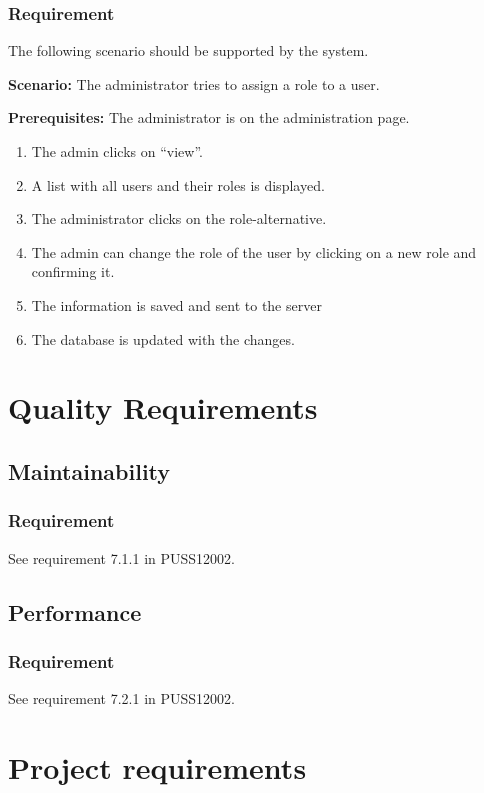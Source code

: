 \documentclass{article}
\begin{document}
\subsubsection{Requirement}
The following scenario should be supported by the system.

\textbf{Scenario:} The administrator tries to assign a role to a user.

\textbf{Prerequisites:} The administrator is on the administration page.

\begin{enumerate}
    \item The admin clicks on “view”.
    \item A list with all users and their roles is displayed.
    \item The administrator clicks on the role-alternative.
    \item The admin can change the role of the user by clicking on a new role and confirming it.
    \item The information is saved and sent to the server
    \item The database is updated with the changes.
\end{enumerate}



\section{Quality Requirements}
\subsection{Maintainability}
\subsubsection{Requirement}
See requirement 7.1.1 in PUSS12002.
\subsection{Performance}
\subsubsection{Requirement}
See requirement 7.2.1 in PUSS12002.




\section{Project requirements}
\end{document}

